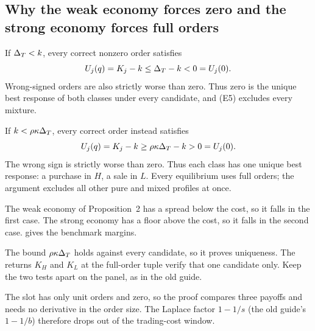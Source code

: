 \subsection{Why the weak economy forces zero and the strong economy forces full orders}
\label{sec:05_investor-force}

If $\Delta_T<k$, every correct nonzero order satisfies
\[
U_j(q)=K_j-k\le\Delta_T-k<0=U_j(0).
\]
Wrong-signed orders are also strictly worse than zero.
Thus zero is the unique best response of both classes under every candidate, and (E5) excludes every mixture.

If $k<\rho\kappa\Delta_T$, every correct order instead satisfies
\[
U_j(q)=K_j-k\ge\rho\kappa\Delta_T-k>0=U_j(0).
\]
The wrong sign is strictly worse than zero.
Thus each class has one unique best response: a purchase in $H$, a sale in $L$.
Every equilibrium uses full orders; the argument excludes all other pure and mixed profiles at once.

The weak economy of Proposition~2 has a spread below the cost, so it falls in the first case.
The strong economy has a floor above the cost, so it falls in the second case.
 gives the benchmark margins.

\begin{caution}
The bound $\rho\kappa\Delta_T$ holds against every candidate, so it proves uniqueness.
The returns $K_H$ and $K_L$ at the full-order tuple verify that one candidate only.
Keep the two tests apart on the panel, as in the old guide.
\end{caution}

\begin{panelnote}
The slot has only unit orders and zero, so the proof compares three payoffs and needs no derivative in the order size.
The Laplace factor $1-1/s$ (the old guide's $1-1/b$) therefore drops out of the trading-cost window.
\end{panelnote}
